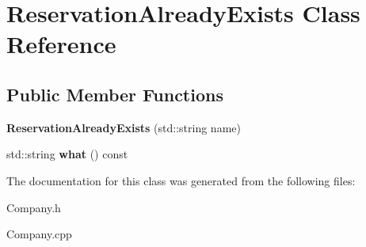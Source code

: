 \hypertarget{class_reservation_already_exists}{}\section{Reservation\+Already\+Exists Class Reference}
\label{class_reservation_already_exists}
\subsection*{Public Member Functions}
\begin{DoxyCompactItemize}
\item 
\mbox{\label{class_reservation_already_exists_aa1680492cc43e3b30695113bf6a01aab}} 
{\bfseries Reservation\+Already\+Exists} (std\+::string name)
\item 
\mbox{\label{class_reservation_already_exists_a01010ef1db3c0be023dc9a2197a5cca4}} 
std\+::string {\bfseries what} () const
\end{DoxyCompactItemize}


The documentation for this class was generated from the following files\+:\begin{DoxyCompactItemize}
\item 
Company.\+h\item 
Company.\+cpp\end{DoxyCompactItemize}
